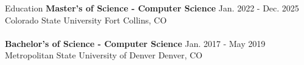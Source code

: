 \documentclass[8pt]{resumeclass}
\begin{document}
\vspace{8pt}
\resumesect
    {Education}
    {\textbf{Master's of Science - Computer Science} \hfill \normalsize{Jan. 2022 - Dec. 2025}\\
    Colorado State University \hfill \normalsize{Fort Collins, CO}\\
    \vspace{-6pt}\\
    \textbf{Bachelor's of Science - Computer Science} \hfill \normalsize{Jan. 2017 - May 2019}\\
    Metropolitan State University of Denver \hfill \normalsize{Denver, CO}}\\
\end{document}
